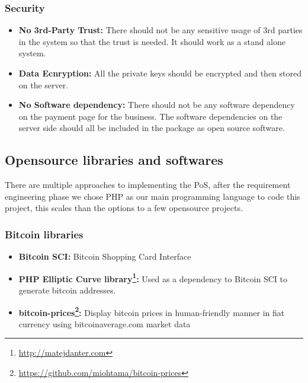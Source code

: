 \subsubsection{Security} 
\begin{itemize}

\item \textbf{No 3rd-Party Trust: } There should not be any sensitive usage of 3rd parties in the system so that the trust is needed. It should work as a stand alone system.

\item \textbf{Data Ecnryption: } All the private keys should be encrypted and then stored on the server. 

\item \textbf{No Software dependency: } There should not be any software dependency on the payment page for the business. The software dependencies on the server side should all be included in the package as open source software.

\end{itemize}



\subsection{Opensource libraries and softwares}
There are multiple approaches to implementing the PoS, after the requirement engineering phase we chose PHP as our main programming language to code this project, this scales than the options to a few opensource projects.

\subsubsection{Bitcoin libraries}
\begin{itemize}

\item \textbf{Bitcoin SCI: }Bitcoin Shopping Card Interface
\item \textbf{PHP Elliptic Curve library\footnote{\url{http://matejdanter.com}}: } Used as a dependency to Bitcoin SCI to generate bitcoin addresses.
\item \textbf{bitcoin-prices\footnote{\url{https://github.com/miohtama/bitcoin-prices}}: } Display bitcoin prices in human-friendly manner in fiat currency using bitcoinaverage.com market data

\end{itemize}

